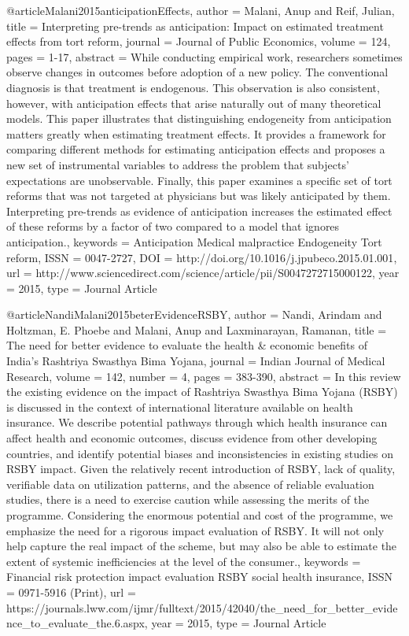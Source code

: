 @article{Malani2015anticipationEffects,
   author = {Malani, Anup and Reif, Julian},
   title = {Interpreting pre-trends as anticipation: Impact on estimated treatment effects from tort reform},
   journal = {Journal of Public Economics},
   volume = {124},
   pages = {1-17},
   abstract = {While conducting empirical work, researchers sometimes observe changes in outcomes before adoption of a new policy. The conventional diagnosis is that treatment is endogenous. This observation is also consistent, however, with anticipation effects that arise naturally out of many theoretical models. This paper illustrates that distinguishing endogeneity from anticipation matters greatly when estimating treatment effects. It provides a framework for comparing different methods for estimating anticipation effects and proposes a new set of instrumental variables to address the problem that subjects' expectations are unobservable. Finally, this paper examines a specific set of tort reforms that was not targeted at physicians but was likely anticipated by them. Interpreting pre-trends as evidence of anticipation increases the estimated effect of these reforms by a factor of two compared to a model that ignores anticipation.},
   keywords = {Anticipation
Medical malpractice
Endogeneity
Tort reform},
   ISSN = {0047-2727},
   DOI = {http://doi.org/10.1016/j.jpubeco.2015.01.001},
   url = {http://www.sciencedirect.com/science/article/pii/S0047272715000122},
   year = {2015},
   type = {Journal Article}
}

@article{NandiMalani2015beterEvidenceRSBY,
   author = {Nandi, Arindam and Holtzman, E. Phoebe and Malani, Anup and Laxminarayan, Ramanan},
   title = {The need for better evidence to evaluate the health & economic benefits of India's Rashtriya Swasthya Bima Yojana},
   journal = {Indian Journal of Medical Research},
   volume = {142},
   number = {4},
   pages = {383-390},
   abstract = {In this review the existing evidence on the impact of Rashtriya Swasthya Bima Yojana (RSBY) is discussed in the context of international literature available on health insurance. We describe potential pathways through which health insurance can affect health and economic outcomes, discuss evidence from other developing countries, and identify potential biases and inconsistencies in existing studies on RSBY impact. Given the relatively recent introduction of RSBY, lack of quality, verifiable data on utilization patterns, and the absence of reliable evaluation studies, there is a need to exercise caution while assessing the merits of the programme. Considering the enormous potential and cost of the programme, we emphasize the need for a rigorous impact evaluation of RSBY. It will not only help capture the real impact of the scheme, but may also be able to estimate the extent of systemic inefficiencies at the level of the consumer.},
   keywords = {Financial risk protection
impact evaluation
RSBY
social health insurance},
   ISSN = {0971-5916 (Print)},
   url = {https://journals.lww.com/ijmr/fulltext/2015/42040/the_need_for_better_evidence_to_evaluate_the.6.aspx},
   year = {2015},
   type = {Journal Article}
}


